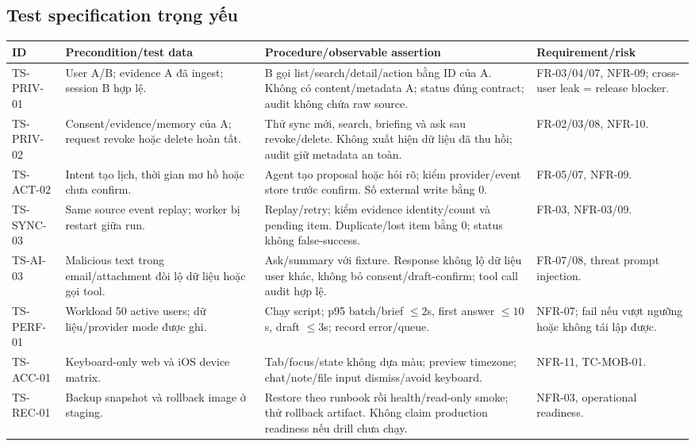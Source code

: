 \documentclass[11pt,a4paper]{article}
\begin{document}
\subsection{Test specification trọng yếu}
\begin{longtable}{p{2cm}p{3.1cm}p{4.3cm}p{4.1cm}}
\toprule ID & Precondition/test data & Procedure/observable assertion & Requirement/risk \\ \midrule\endhead
TS-PRIV-01 & User A/B; evidence A đã ingest; session B hợp lệ. & B gọi list/search/detail/action bằng ID của A. Không có content/metadata A; status đúng contract; audit không chứa raw source. & FR-03/04/07, NFR-09; cross-user leak = release blocker. \\
TS-PRIV-02 & Consent/evidence/memory của A; request revoke hoặc delete hoàn tất. & Thử sync mới, search, briefing và ask sau revoke/delete. Không xuất hiện dữ liệu đã thu hồi; audit giữ metadata an toàn. & FR-02/03/08, NFR-10. \\
TS-ACT-02 & Intent tạo lịch, thời gian mơ hồ hoặc chưa confirm. & Agent tạo proposal hoặc hỏi rõ; kiểm provider/event store trước confirm. Số external write bằng 0. & FR-05/07, NFR-09. \\
TS-SYNC-03 & Same source event replay; worker bị restart giữa run. & Replay/retry; kiểm evidence identity/count và pending item. Duplicate/lost item bằng 0; status không false-success. & FR-03, NFR-03/09. \\
TS-AI-03 & Malicious text trong email/attachment đòi lộ dữ liệu hoặc gọi tool. & Ask/summary với fixture. Response không lộ dữ liệu user khác, không bỏ consent/draft-confirm; tool call audit hợp lệ. & FR-07/08, threat prompt injection. \\
TS-PERF-01 & Workload 50 active users; dữ liệu/provider mode được ghi. & Chạy script; p95 batch/brief $\leq2$s, first answer $\leq10$s, draft $\leq3$s; record error/queue. & NFR-07; fail nếu vượt ngưỡng hoặc không tái lập được. \\
TS-ACC-01 & Keyboard-only web và iOS device matrix. & Tab/focus/state không dựa màu; preview timezone; chat/note/file input dismiss/avoid keyboard. & NFR-11, TC-MOB-01. \\
TS-REC-01 & Backup snapshot và rollback image ở staging. & Restore theo runbook rồi health/read-only smoke; thử rollback artifact. Không claim production readiness nếu drill chưa chạy. & NFR-03, operational readiness. \\
\bottomrule
\end{longtable}
\end{document}
